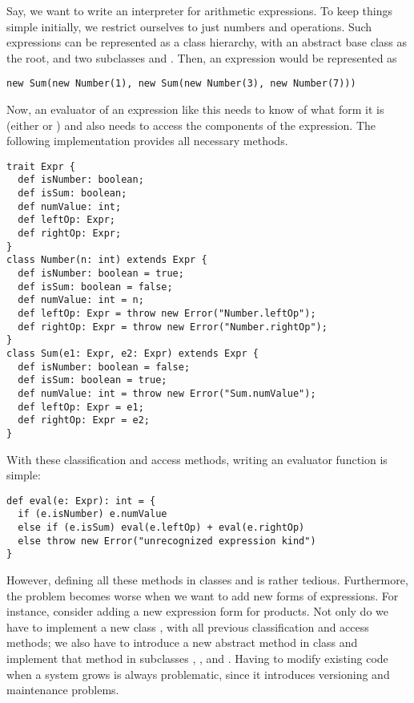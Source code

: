\documentclass[a4paper,12pt,twoside,titlepage]{book}
\begin{document}
Say, we want to write an interpreter for arithmetic expressions.  To
keep things simple initially, we restrict ourselves to just numbers
and \code{+} operations. Such expressions can be represented as a class hierarchy, with an abstract base class  as the root, and two subclasses  and
. Then, an expression  would be represented as
\begin{lstlisting}
new Sum(new Number(1), new Sum(new Number(3), new Number(7)))
\end{lstlisting}
Now, an evaluator of an expression like this needs to know of what
form it is (either  or ) and also needs to
access the components of the expression.  The following
implementation provides all necessary methods.
\begin{lstlisting}
trait Expr {
  def isNumber: boolean;
  def isSum: boolean;
  def numValue: int;
  def leftOp: Expr;
  def rightOp: Expr;
}
class Number(n: int) extends Expr {
  def isNumber: boolean = true;
  def isSum: boolean = false;
  def numValue: int = n;
  def leftOp: Expr = throw new Error("Number.leftOp");
  def rightOp: Expr = throw new Error("Number.rightOp");
}
class Sum(e1: Expr, e2: Expr) extends Expr {
  def isNumber: boolean = false;
  def isSum: boolean = true;
  def numValue: int = throw new Error("Sum.numValue");
  def leftOp: Expr = e1;
  def rightOp: Expr = e2;
}
\end{lstlisting}
With these classification and access methods, writing an evaluator function is simple:
\begin{lstlisting}
def eval(e: Expr): int = {
  if (e.isNumber) e.numValue
  else if (e.isSum) eval(e.leftOp) + eval(e.rightOp)
  else throw new Error("unrecognized expression kind")
}
\end{lstlisting}
However, defining all these methods in classes  and
 is rather tedious. Furthermore, the problem becomes worse 
when we want to add new forms of expressions. For instance, consider
adding a new expression form
 for products. Not only do we have to implement a new class , with all previous classification and access methods; we also have to introduce a
new abstract method  in class  and
implement that method in subclasses , , and
. Having to modify existing code when a system grows is always problematic, since it introduces versioning and maintenance problems. 
\end{document}
